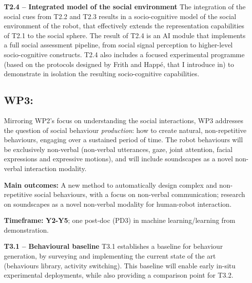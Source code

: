 \textbf{T2.4 -- Integrated model of the social environment} The integration of
the social cues from T2.2 and T2.3 results in a socio-cognitive model of the
social environment of the robot, that effectively extends the representation
capabilities of T2.1 to the social sphere. The result of T2.4 is an AI module
that implements a full social assessment pipeline, from social signal perception
to higher-level socio-cognitive constructs. T2.4 also includes a
focused experimental programme (based on the protocols designed by Frith and
Happé, that I introduce in) to
demonstrate in isolation the resulting socio-cognitive capabilities.


\subsection{WP3: \textbf{\wpThree}} 

Mirroring WP2's focus on understanding the social interactions, WP3 addresses the
question of social behaviour \emph{production}: how to create natural,
non-repetitive behaviours, engaging over a sustained period of time. The robot
behaviours will be exclusively non-verbal (non-verbal utterances, gaze, joint
attention, facial expressions and expressive motions), and will include
soundscapes as a novel non-verbal interaction modality.

\begin{framed}

    \textbf{Main outcomes:} A new method to automatically design complex and
    non-repetitive social behaviours, with a focus on non-verbal communication;
    research on soundscapes as a novel non-verbal modality for human-robot
    interaction.

    \textbf{Timeframe:} \textbf{Y2-Y5}; one post-doc (PD3) in machine learning/learning from
demonstration.

\end{framed}

\textbf{T3.1 -- Behavioural baseline} T3.1 establishes a baseline for behaviour
generation, by surveying and implementing the current state of the art
(behaviours library, activity switching). This
baseline will enable early in-situ experimental deployments, while also
providing a comparison point for T3.2.

